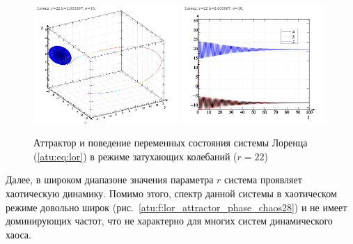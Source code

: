 \begin{figure}[h!]
\begin{center}
  \includegraphics[width=0.49\textwidth]{p/cha/lor/lor0-p_xyz_r=022.png}
  \hfill
  \includegraphics[width=0.49\textwidth]{p/cha/lor/lor0-p_t_r=022.png}
\end{center}
  \caption{Аттрактор и поведение переменных состояния системы Лоренца (\ref{atu:eq:lor}) в режиме затухающих колебаний ($r=22$)}
\label{atu:f:lor_attractor_fading}
\end{figure}

Далее,  в широком диапазоне значения параметра $r$
система проявляет хаотическую динамику. Помимо
этого, спектр данной системы в хаотическом режиме довольно широк
(рис.~\ref{atu:f:lor_attractor_phase_chaos28})
и не имеет доминирующих частот, что не характерно для многих систем
динамического хаоса.

